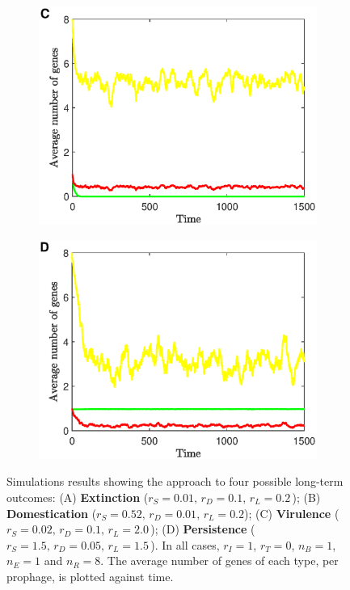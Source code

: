 \begin{figure}[hbt!]
\begin{subfigure}[t]{0.50\textwidth}
        \includegraphics[scale=0.50]{E_liSim}
    \end{subfigure}\hfill   \begin{subfigure}[t]{0.50\textwidth}
    \includegraphics[scale=0.50]{E_libSim}
    \end{subfigure} 
     \caption[Simulations results showing the approach to four possible long-term outcomes.]{Simulations results showing the approach to four possible long-term outcomes:  (A) {\bf Extinction} ($r_S = 0.01 , \, r_D =0.1 , \, r_L =0.2 \, $);  (B) {\bf Domestication} ($r_S = 0.52 , \, r_D =0.01 , \, r_L =0.2  $); (C) {\bf Virulence} ($r_S = 0.02 , \, r_D =0.1 , \, r_L = 2.0  \, $); (D) {\bf Persistence} ($r_S = 1.5, \, r_D =0.05 , \, r_L =1.5  \, $).  In all cases, $r_I=1$, $r_T=0$, $n_B=1$, $n_E=1$ and $n_R=8$. The average number of genes of each type, per prophage, is plotted against time. }
     \label{fig:simresults}
     \end{figure}
 
